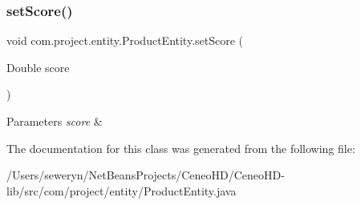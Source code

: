 \subsubsection{set\+Score()}
{\footnotesize\ttfamily void com.\+project.\+entity.\+Product\+Entity.\+set\+Score (\begin{DoxyParamCaption}\item[{Double}]{score }\end{DoxyParamCaption})}


\begin{DoxyParams}{Parameters}
{\em score} & \\
\hline
\end{DoxyParams}


The documentation for this class was generated from the following file\+:\begin{DoxyCompactItemize}
\item 
/\+Users/seweryn/\+Net\+Beans\+Projects/\+Ceneo\+H\+D/\+Ceneo\+H\+D-\/lib/src/com/project/entity/Product\+Entity.\+java\end{DoxyCompactItemize}
